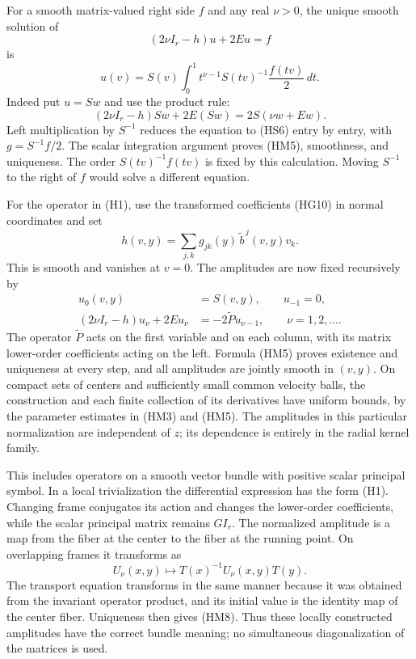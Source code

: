 \documentclass[
  11pt,
]{article}
\begin{document}
For a smooth matrix-valued right side \(f\) and any real \(\nu>0\), the
unique smooth solution of \[
                  (2\nu I_r-h)u+2Eu=f                         \tag{HM4}
\] is \[
      u(v)=S(v)\int_0^1
                  t^{\nu-1}S(tv)^{-1}\frac{f(tv)}2\,dt.        \tag{HM5}
\] Indeed put \(u=Sw\) and use the product rule: \[
 (2\nu I_r-h)Sw+2E(Sw)=2S(\nu w+Ew).
\] Left multiplication by \(S^{-1}\) reduces the equation to (HS6) entry
by entry, with \(g=S^{-1}f/2\). The scalar integration argument proves
(HM5), smoothness, and uniqueness. The order \(S(tv)^{-1}f(tv)\) is
fixed by this calculation. Moving \(S^{-1}\) to the right of \(f\) would
solve a different equation.

For the operator in (H1), use the transformed coefficients (HG10) in
normal coordinates and set \[
                h(v,y)=\sum_{j,k}g_{jk}(y)\,
                                   \widetilde b^{\,j}(v,y)v_k.
                                                                    \tag{HM6}
\] This is smooth and vanishes at \(v=0\). The amplitudes are now fixed
recursively by \[
\begin{split}
 u_0(v,y)&=S(v,y),\qquad u_{-1}=0,\\
 (2\nu I_r-h)u_\nu+2Eu_\nu&=-2\widetilde P u_{\nu-1},
                       \qquad \nu=1,2,\ldots .
\end{split}                                                       \tag{HM7}
\] The operator \(\widetilde P\) acts on the first variable and on each
column, with its matrix lower-order coefficients acting on the left.
Formula (HM5) proves existence and uniqueness at every step, and all
amplitudes are jointly smooth in \((v,y)\). On compact sets of centers
and sufficiently small common velocity balls, the construction and each
finite collection of its derivatives have uniform bounds, by the
parameter estimates in (HM3) and (HM5). The amplitudes in this
particular normalization are independent of \(z\); its dependence is
entirely in the radial kernel family.

This includes operators on a smooth vector bundle with positive scalar
principal symbol. In a local trivialization the differential expression
has the form (H1). Changing frame conjugates its action and changes the
lower-order coefficients, while the scalar principal matrix remains
\(G I_r\). The normalized amplitude is a map from the fiber at the
center to the fiber at the running point. On overlapping frames it
transforms as \[
                  U_\nu(x,y)\longmapsto
                    T(x)^{-1}U_\nu(x,y)T(y).                  \tag{HM8}
\] The transport equation transforms in the same manner because it was
obtained from the invariant operator product, and its initial value is
the identity map of the center fiber. Uniqueness then gives (HM8). Thus
these locally constructed amplitudes have the correct bundle meaning; no
simultaneous diagonalization of the matrices is used.
\end{document}
